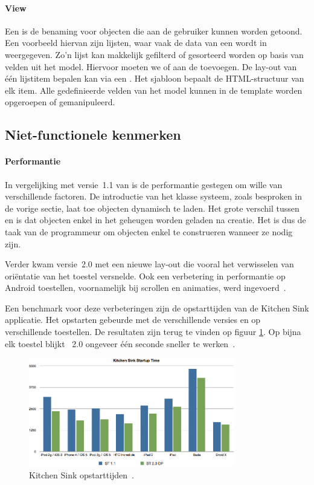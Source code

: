 \paragraph{View}
Een  is de benaming voor objecten die aan de gebruiker kunnen worden getoond.  
Een voorbeeld hiervan zijn lijsten,  waar vaak de data van een  wordt in weergegeven.  
Zo'n lijst kan makkelijk gefilterd of gesorteerd worden op basis van velden uit het model.  
Hiervoor moeten we  of  aan de  toevoegen. 
De lay-out van één lijstitem bepalen kan via een .  
Het sjabloon bepaalt de HTML-structuur van elk item.  
Alle gedefinieerde velden van het model kunnen in de template worden opgeroepen of gemanipuleerd.


\subsection{Niet-functionele kenmerken}
\paragraph{Performantie}
In vergelijking met versie~1.1 van \st{} is de performantie gestegen om wille van verschillende factoren.  
De introductie van het klasse systeem,  zoals besproken in de vorige sectie,  laat toe objecten dynamisch te laden. 
Het grote verschil tussen  en  is dat objecten enkel in het geheugen worden geladen na creatie.  
Het is dus de taak van de programmeur om objecten enkel te construeren wanneer ze nodig zijn.

Verder kwam versie~2.0 met een nieuwe lay-out  die vooral het verwisselen van oriëntatie van het toestel versnelde.  
Ook een verbetering in performantie op Android toestellen,  voornamelijk bij scrollen en animaties,  werd ingevoerd~\cite{Inc.}.

Een benchmark voor deze verbeteringen zijn de opstarttijden van de Kitchen Sink applicatie.  
Het opstarten gebeurde met de verschillende \st{} versies en op verschillende toestellen.  
De resultaten zijn terug te vinden op figuur \ref{fig:sencha_performance}.  
Op bijna elk toestel blijkt \st{}~2.0 ongeveer één seconde sneller te werken~\cite{SenchaInc.2013}.

\begin{figure}
  \centering
  \includegraphics[width=0.8\textwidth]{figuren/sencha-touch-startup-times.png}
  \caption{\st{} Kitchen Sink opstarttijden~\cite{SenchaInc.2013}.}
  \label{fig:sencha_performance}
\end{figure}

